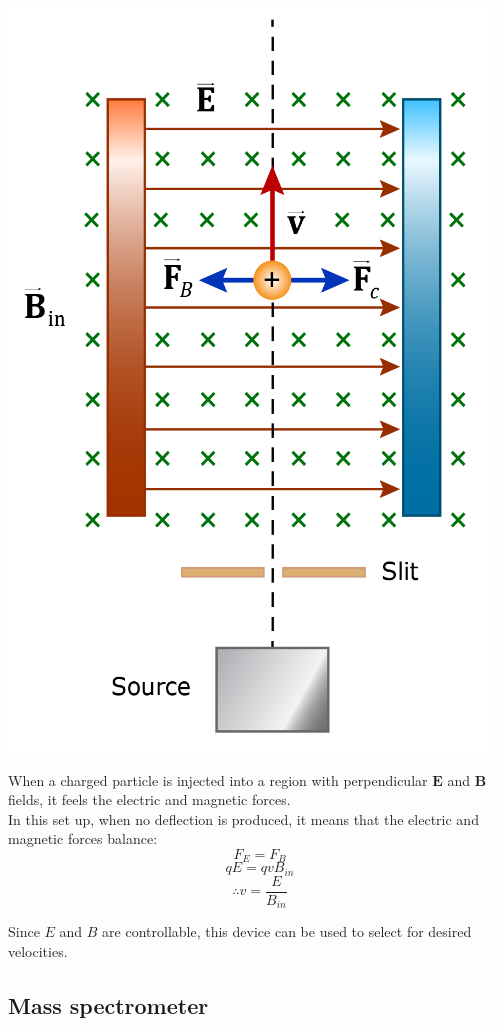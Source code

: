 \documentclass[11pt]{article}
\begin{document}
\begin{center}
\includegraphics[scale=0.7]{./images/velocity-selector.png}
\end{center}

When a charged particle is injected into a region with perpendicular \(\boldsymbol{E}\) and \(\boldsymbol{B}\) fields, it feels the electric and magnetic forces.
\\[0pt]

In this set up, when no deflection is produced, it means that the electric and magnetic forces balance:
\[F_E = F_B\]
\[qE = qv B_{in}\]
\[\therefore v = \frac{E}{B_{in}}\]

Since \(E\) and \(B\) are controllable, this device can be used to select for desired velocities.

\subsection{Mass spectrometer}
\label{sec:orgc89838a}
\end{document}
